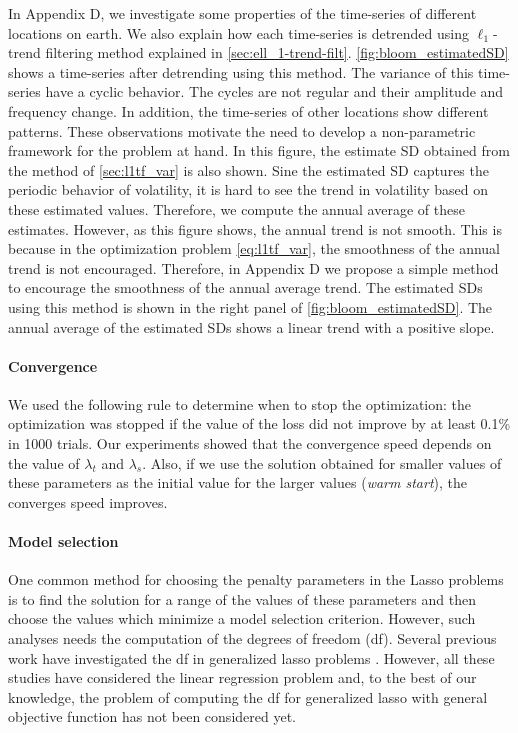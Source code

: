 \documentclass{article}
\begin{document}
In Appendix D, we investigate some properties of the time-series of different locations on earth. We also explain how each time-series is detrended using $\ell_1$-trend filtering method explained in \autoref{sec:ell_1-trend-filt}. \autoref{fig:bloom_estimatedSD} shows a time-series after detrending using this method. The variance of this time-series have a cyclic behavior. The cycles are not regular and their amplitude and frequency change. In addition, the time-series of other locations show different patterns. These observations motivate the need to develop a non-parametric framework for the problem at hand. In this figure, the estimate SD obtained from the method of \autoref{sec:l1tf_var} is also shown. Sine the estimated SD captures the periodic behavior of volatility, it is hard to see the trend in volatility based on these estimated values. Therefore, we compute the annual average of these estimates. However, as this figure shows, the annual trend is not smooth. This is because in the optimization problem \eqref{eq:l1tf_var}, the smoothness of the annual trend is not encouraged. Therefore, in Appendix D we propose a simple method to encourage the smoothness of the annual average trend. The estimated SDs using this method is shown in the right panel of \autoref{fig:bloom_estimatedSD}. The annual average of the estimated SDs shows a linear trend with a positive slope. 

\paragraph{Convergence}

We used the following rule to determine when to stop the optimization: the optimization was stopped if the value of the loss did not improve by at least 0.1\% in 1000 trials. Our experiments showed that the convergence speed depends on the value of $\lambda_t$ and $\lambda_s$. Also, if we use the solution obtained for smaller values of these parameters as the initial value for the larger values (\textit{warm start}), the converges speed improves. 


\paragraph{Model selection}
One common method for choosing the penalty parameters in the Lasso
problems is to find the solution for a range of the values of these
parameters and then choose the values which minimize a model selection
criterion. However, such analyses needs the computation of the degrees
of freedom (df). Several previous work have investigated the df in
generalized lasso problems
\citep{tibshirani_degrees_2012,hu_dual_2015,zeng_geometry_2017}. However,
all these studies have considered the linear regression problem and,
to the best of our knowledge, the problem of computing the df for
generalized lasso with general objective function has not been
considered yet. 
\end{document}
